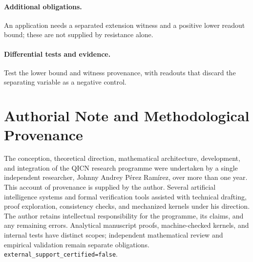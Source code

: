 \documentclass[11pt,a4paper]{article}
\theoremstyle{plain}
\theoremstyle{definition}
\theoremstyle{remark}
\begin{document}
\paragraph{Additional obligations.} An application needs a separated extension witness and a positive lower readout bound; these are not supplied by resistance alone.

\paragraph{Differential tests and evidence.} Test the lower bound and witness provenance, with readouts that discard the separating variable as a negative control.



\printbibliography

\section*{Authorial Note and Methodological Provenance}
The conception, theoretical direction, mathematical architecture, development,
and integration of the QICN research programme were undertaken by a single
independent researcher, Johnny Andrey P\'erez Ram\'irez, over more than one year.
This account of provenance is supplied by the author. Several artificial
intelligence systems and formal verification tools assisted with technical
drafting, proof exploration, consistency checks, and mechanized kernels under
his direction. The author retains intellectual responsibility for the
programme, its claims, and any remaining errors. Analytical manuscript proofs,
machine-checked kernels, and internal tests have distinct scopes; independent
mathematical review and empirical validation remain separate obligations.
\texttt{external\_support\_certified=false}.
\end{document}
